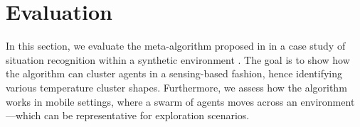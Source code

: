 \section{Evaluation}
\label{s:eval}


In this section, we evaluate the meta-algorithm proposed in 
 in a case study of situation recognition within a synthetic environment .
%
The goal  is to show how the algorithm
 can cluster agents in a sensing-based fashion,
 hence identifying various temperature cluster shapes.
%
Furthermore, we assess how the algorithm works in mobile settings,
 where a swarm of agents moves across an environment---which can be representative for exploration scenarios.
%


